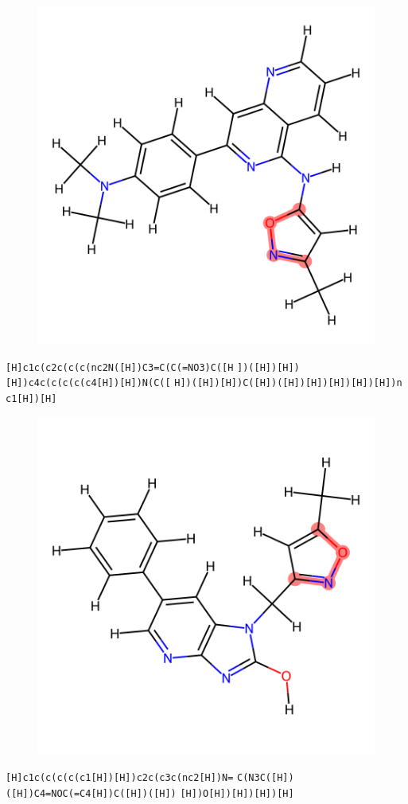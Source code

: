 \documentclass{article}
\begin{document}
\begin{figure}[ht]
\centering
    \includegraphics{mol96.png}
\end{figure}
\verb|[H]c1c(c2c(c(c(nc2N([H])C3=C(C(=NO3)C([H| \verb|])([H])[H])[H])c4c(c(c(c(c4[H])[H])N(C([| \verb|H])([H])[H])C([H])([H])[H])[H])[H])[H])n| \verb|c1[H])[H]|

\begin{figure}[ht]
\centering
    \includegraphics{mol97.png}
\end{figure}
\verb|[H]c1c(c(c(c(c1[H])[H])c2c(c3c(nc2[H])N=| \verb|C(N3C([H])([H])C4=NOC(=C4[H])C([H])([H])| \verb|[H])O[H])[H])[H])[H]|
\end{document}
